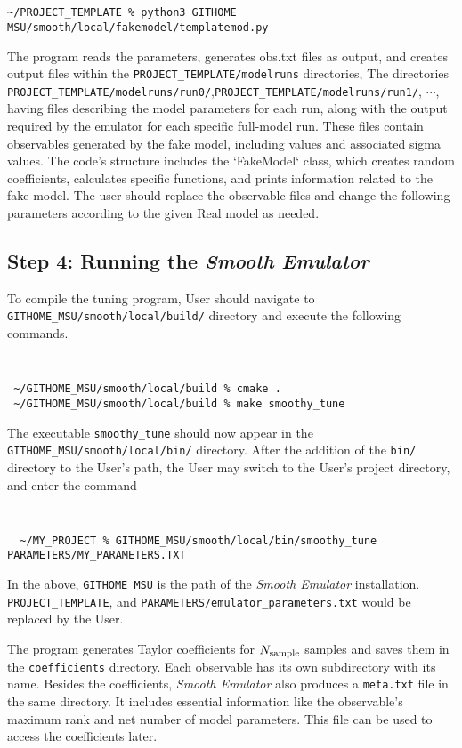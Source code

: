 \documentclass[main.tex]{subfiles}
\begin{document}
\
\vspace{-20pt}
{\tt
\begin{verbatim}
~/PROJECT_TEMPLATE % python3 GITHOME MSU/smooth/local/fakemodel/templatemod.py
\end{verbatim}
}
The program reads the parameters, generates obs.txt files as output, and creates output files within the {\tt PROJECT\_TEMPLATE/modelruns} directories, The directories
{\tt  PROJECT\_TEMPLATE/modelruns/run0/},{\tt  PROJECT\_TEMPLATE/modelruns/run1/}, $\cdots$, having files describing the model parameters for each run, along with the output required by the emulator for each specific full-model run. These files contain observables generated by the fake model, including values and associated sigma values. The code's structure includes the `FakeModel` class, which creates random coefficients, calculates specific functions, and prints information related to the fake model. The user should replace the observable files and change the following parameters according to the given Real model as needed.


\subsection{Step 4: Running the {\it Smooth Emulator}}
To compile the tuning program, User should navigate to {\tt GITHOME\_MSU/smooth/local/build/} directory and execute the following commands.
{\tt
\begin{verbatim}
 ~/GITHOME_MSU/smooth/local/build % cmake .
 ~/GITHOME_MSU/smooth/local/build % make smoothy_tune
\end{verbatim}
}
The executable {\tt smoothy\_tune} should now appear in the {\tt GITHOME\_MSU/smooth/local/bin/} directory. After the addition of the {\tt bin/} directory to the User's path, the User may switch to the User's project directory, and enter the command
{\tt
\begin{verbatim}
  ~/MY_PROJECT % GITHOME_MSU/smooth/local/bin/smoothy_tune PARAMETERS/MY_PARAMETERS.TXT
\end{verbatim}
}
In the above, {\tt GITHOME\_MSU} is the path of the {\it Smooth Emulator} installation. {\tt PROJECT\_TEMPLATE}, and {\tt PARAMETERS/emulator\_parameters.txt} would be replaced by the User.

The program generates Taylor coefficients for $N_{\rm sample}$ samples and saves them in the {\tt coefficients} directory. Each observable has its own subdirectory with its name. Besides the coefficients, {\it Smooth Emulator} also produces a {\tt meta.txt} file in the same directory. It includes essential information like the observable's maximum rank and net number of model parameters. This file can be used to access the coefficients later.
\end{document}
